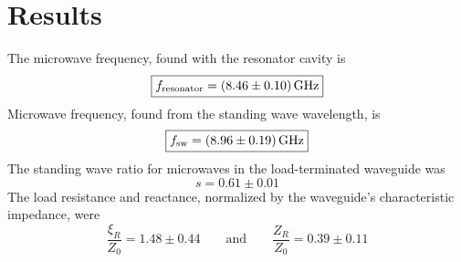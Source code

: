 \documentclass[11pt, a4paper]{article}
\newcommand{\eqtext}[1]{\qquad \text{#1} \qquad}
\begin{document}
\section{Results}
The microwave frequency, found with the resonator cavity is
\begin{equation*}
	\boxed{f_{\text{resonator}} = \SI{8.46 \pm 0.10}{\giga \hertz}}
\end{equation*}
Microwave frequency, found from the standing wave wavelength, is
\begin{equation*}
	\boxed{f_{\text{sw}} = \SI{8.96 \pm 0.19}{\giga \hertz}}
\end{equation*}
The standing wave ratio for microwaves in the load-terminated waveguide was
\begin{equation*}
	\boxed{s = 0.61 \pm 0.01}
\end{equation*}
The load resistance and reactance, normalized by the waveguide's characteristic impedance, were
\begin{equation*}
\boxed{	\frac{\xi_{R}}{Z_{0}} = 1.48 \pm 0.44} \eqtext{and} \boxed{\frac{Z_{R}}{Z_{0}} = 0.39 \pm 0.11}
\end{equation*}
\end{document}
